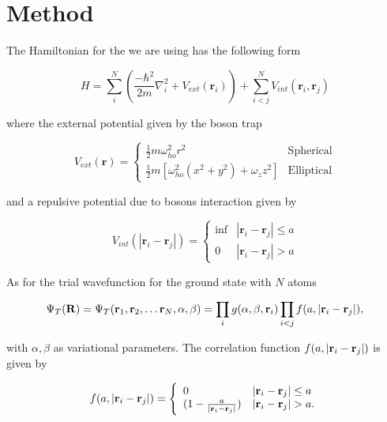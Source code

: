 \documentclass[12pt]{article}
\begin{document}
\section{Method}

  The Hamiltonian for the we are using has the following form

  \begin{equation}
     H = \sum_i^N \left(\frac{-\hbar^2}{2m}\nabla^2_i + V_{ext}(\bm{r}_i)\right) + %
     \sum_{i< j}^N V_{int}(\bm{r}_i,\bm{r}_j)
  \end{equation}

  where the external potential given by the boson trap

  \begin{equation}
    V_{ext}(\bm{r}) = \left\{
    \begin{array}{lr}
      \frac{1}{2}m\omega_{ho}^2r^2 & \text{Spherical}\\
      \frac{1}{2}m[\omega_{ho}^2(x^2 + y^2) + \omega_z z^2] & \text{Elliptical}
    \end{array}
    \right.
  \end{equation}

  and a repulsive potential due to bosons interaction given by

  \begin{equation}
    V_{int}(|\bm{r}_i - \bm{r}_j|) = \left\{
    \begin{array}{lr}
      \inf & |\bm{r}_i - \bm{r}_j| \leq a\\
      0 & |\bm{r}_i - \bm{r}_j| > a
    \end{array}
    \right.
  \end{equation}

  As for the trial wavefunction for the ground state with $N$ atoms

  \begin{equation}
    \Psi_T({\bf R})=\Psi_T({\bf r}_1, {\bf r}_2, \dots {\bf r}_N,\alpha,\beta)=\prod_i%
    g(\alpha,\beta,{\bf r}_i)\prod_{i<j}f(a,|{\bf r}_i-{\bf r}_j|),
  \end{equation}

  with $\alpha, \beta$ as variational parameters. The correlation function 
  $f(a,|{\bf r}_i-{\bf r}_j|)$ is given by

  \begin{equation}
    f(a,|{\bf r}_i-{\bf r}_j|)=\Bigg\{
    \begin{array}{ll}
      0 & {|{\bf r}_i-{\bf r}_j|} \leq {a}\\
	(1-\frac{a}{|{\bf r}_i-{\bf r}_j|}) & {|{\bf r}_i-{\bf r}_j|} > {a}.
    \end{array}
  \end{equation}  
\end{document}

